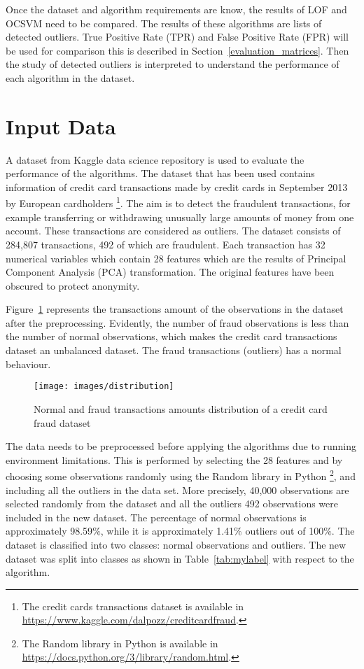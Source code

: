 Once the dataset and algorithm requirements are know, the results of LOF and OCSVM need to be compared. The results of these algorithms are lists of detected outliers. True Positive Rate (TPR) and False Positive Rate (FPR) will be used for comparison this is described in Section~\ref{evaluation_matrices}. Then the study of detected outliers is interpreted to understand the performance of each algorithm in the dataset.
\section{Input Data}
A dataset from Kaggle data science repository is used to evaluate the performance of the algorithms. The dataset that has been used contains information of credit card transactions made by credit cards in September 2013 by European cardholders \footnote{The credit cards transactions dataset is available in \url{https://www.kaggle.com/dalpozz/creditcardfraud}.}. The aim is to detect the fraudulent transactions, for example transferring or withdrawing unusually large amounts of money from one account. These transactions are considered as outliers.
The dataset consists of 284,807 transactions, 492 of which are fraudulent. Each transaction has 32 numerical variables which contain 28 features which are the results of Principal Component Analysis (PCA) transformation. The original features have been obscured to protect anonymity. 

Figure~\ref{distribution} represents the transactions amount of the observations in the dataset after the preprocessing. Evidently, the number of fraud observations is less than the number of normal observations, which makes the credit card transactions dataset an unbalanced dataset. The fraud transactions (outliers) has a normal behaviour.
\begin{figure}[!h]
\texttt{[image: images/distribution]}
\caption{Normal and fraud transactions amounts distribution of a credit card fraud dataset}
\label{distribution} 
\end{figure}

The data needs to be preprocessed before applying the algorithms due to running environment limitations. This is performed by selecting the 28 features and by choosing some observations randomly using the Random library in Python \footnote{The Random library in Python is available in \url{https://docs.python.org/3/library/random.html}.}, and including all the outliers in the data set. More precisely, 40,000 observations are selected randomly from the dataset and all the outliers 492 observations were included in the new dataset. \newpage
The percentage of normal observations is approximately 98.59$\%$, while it is approximately 1.41$\%$ outliers out of 100$\%$.  The dataset is classified into two classes: normal observations and outliers.
The new dataset was split into classes as shown in Table~\ref{tab:mylabel} with respect to the algorithm.

